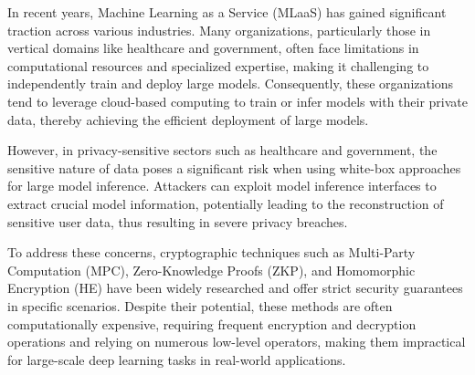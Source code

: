\documentclass{article}
\begin{document}






In recent years, Machine Learning as a Service (MLaaS) has gained significant traction across various industries. Many organizations, particularly those in vertical domains like healthcare and government, often face limitations in computational resources and specialized expertise, making it challenging to independently train and deploy large models. Consequently, these organizations tend to leverage cloud-based computing to train or infer models with their private data, thereby achieving the efficient deployment of large models.

However, in privacy-sensitive sectors such as healthcare and government, the sensitive nature of data poses a significant risk when using white-box approaches for large model inference. Attackers can exploit model inference interfaces to extract crucial model information, potentially leading to the reconstruction of sensitive user data, thus resulting in severe privacy breaches.

To address these concerns, cryptographic techniques such as Multi-Party Computation (MPC), Zero-Knowledge Proofs (ZKP), and Homomorphic Encryption (HE) have been widely researched and offer strict security guarantees in specific scenarios. Despite their potential, these methods are often computationally expensive, requiring frequent encryption and decryption operations and relying on numerous low-level operators, making them impractical for large-scale deep learning tasks in real-world applications.
\end{document}
